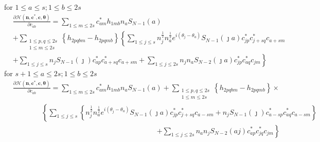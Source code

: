 \documentclass[aps,preprint]{revtex4}%
\begin{document}
for $1\leq a\leq s;1\leq b\leq2s$%
\begin{align}
&  \frac{\partial\mathcal{H}\left(  \mathbf{n},\mathbf{c}^{\ast}%
\mathbf{,c},\mathbf{\theta}\right)  }{\partial c_{ab}}=\sum_{1\leq m\leq
2s}c_{am}^{\ast}h_{1mb}n_{a}S_{N-1}\left(  a\right)  \nonumber\\
&  +\sum_{\substack{1\leq p,q\leq2s\\1\leq m\leq2s}}\left\{  h_{2pqbm}%
-h_{2pqmb}\right\}  \left\{  \sum_{1\leq j\leq s}n_{j}^{\frac{1}{2}}%
n_{a}^{\frac{1}{2}}e^{i\left(  \theta_{j}-\theta_{a}\right)  }S_{N-1}\left(
\jmath a\right)  c_{jp}^{\ast}c_{j+sq}^{\ast}c_{a+sm}\right.  \nonumber\\
&  +\sum_{1\leq j\leq s}n_{j}S_{N-1}\left(  \jmath\right)  c_{ap}^{\ast
}c_{a+sq}^{\ast}c_{a+sm}+\left.  \sum_{1\leq j\leq2s}n_{j}n_{a}S_{N-2}\left(
\jmath a\right)  c_{jp}^{\ast}c_{aq}^{\ast}c_{jm}\right\}
\end{align}
for $s+1\leq a\leq2s;1\leq b\leq2s$%
\begin{align}
&  \frac{\partial\mathcal{H}\left(  \mathbf{n},\mathbf{c}^{\ast}%
\mathbf{,c},\mathbf{\theta}\right)  }{\partial c_{ab}}=\sum_{1\leq m\leq
2s}c_{am}^{\ast}h_{1mb}n_{a}S_{N-1}\left(  a\right)  +\sum_{\substack{1\leq
p,q\leq2s\\1\leq m\leq2s}}\left\{  h_{2pqbm}-h_{2pqmb}\right\}  \times
\nonumber\\
&  \qquad\qquad\left\{  \sum_{1\leq j\leq s}\left\{  n_{j}^{\frac{1}{2}}%
n_{a}^{\frac{1}{2}}e^{i\left(  \theta_{j}-\theta_{a}\right)  }S_{N-1}\left(
\jmath a\right)  c_{jp}^{\ast}c_{j+sq}^{\ast}c_{a-sm}+n_{j}S_{N-1}\left(
\jmath\right)  c_{a-sp}^{\ast}c_{aq}^{\ast}c_{a-sm}\right\}  \right.  \\
&  \qquad\qquad\qquad\qquad\qquad\qquad\qquad\qquad\qquad\qquad\left.
+\sum_{1\leq j\leq2s}n_{a}n_{j}S_{N-2}\left(  aj\right)  c_{ap}^{\ast}%
c_{jq}^{\ast}c_{jm}\right\}
\end{align}
\end{document}
